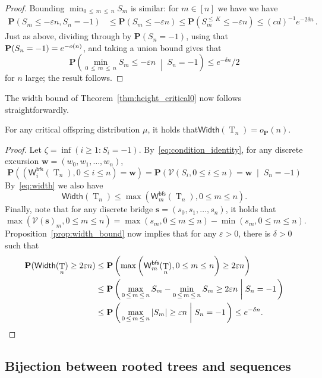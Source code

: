\documentclass[AHL,Unicode,longabstracts,published]{cedram}
\newcommand*\W{\mathsf{W}}
\newcommand{\bfs}{\mathsf{bfs}}
\newcommand{\p}{\mathbf{P}}
\newcommand{\bfw}{\mathbf{w}}
\newcommand{\bffs}{\mathbf{s}}
\newcommand{\Width}{\mathsf{Width}}
\DeclareMathOperator{\rtree}{T}
\newcommand{\cV}{\mathcal{V}}
\newcommand{\set}[1]{\left(#1 \right)}
\newcommand{\Cprob}[2]{\mathbf{P}\set{\left. #1 \; \middle| \; #2\right.}}
\newcommand{\probC}[2]{\mathbf{P}\set{\left. #1 \; \middle| \; #2 \right. }}
\providecommand{\eps}{}
\renewcommand{\eps}{\varepsilon}
\begin{document}
\begin{proof}
Bounding $\min_{0\, \le\,m\,\le\,n} S_m$ is similar: for $m \in [n]$ we have we have
\begin{align*}
\p(S_m \le -\eps n,S_n=-1) & \le \p(S_m \le -\eps n) \le
\p\left(S_m^{\le\,K} \le -\eps n\right)
\le (cd)^{-1} e^{-2\delta n}\,.
\end{align*}
Just as above, dividing through by $\p(S_n=-1)$, using that $\p(S_n = -1)\linebreak = e^{-o(n)}$, and taking a union bound gives that
\[
\probC{\min_{0\,\le\,m\,\le\,n} S_m \le -\eps n}{S_n=-1}
\le e^{-\delta n}/2
\]
for $n$ large; the result follows.
\end{proof}

The width bound of Theorem~\ref{thm:height_critical0} now follows straightforwardly.
\begin{coro}\label{cor:width_bound}
For any critical offspring distribution $\mu$, it holds that\linebreak $\Width(\rtree_n)=o_{\p}(n)$.
\end{coro}
\begin{proof}
Let $\zeta=\inf(i \ge 1: S_i=-1)$. By~\eqref{eq:condition_identity}, for any discrete excursion $\bfw=(w_0,w_1,\ldots,w_n)$,
\[
\p\left(\left(\W^{\bfs}_{i}(\rtree_n),0 \le i \le n\right)=\bfw\right) =
\Cprob{\cV(S_i,0 \le i \le n)=\bfw}{S_n=-1}
\]
By~\eqref{eq:width} we also have
\[
\Width(\rtree_n) \leq \max \left(\W^{\bfs}_m(\rtree_n),0 \le m \le n\right).
\]
Finally, note that for any discrete bridge $\bffs=(s_0,s_1,\ldots,s_n)$, it holds that
\[
\max(\cV(\bffs)_m,0 \le m \le n) = \max(s_m,0 \le m \le n)-\min(s_m,0 \le m \le n).
\]
Proposition~\ref{prop:width_bound} now implies that for any $\eps > 0$, there is $\delta > 0$ such that
\begin{align*}
\p(\Width(\rtree_n) \ge 2\eps n) & \le \p\left(\max \left(\W^{\bfs}_m(\rtree_n),0 \le m \le n\right) \ge 2\eps n\right) \\
& \le \Cprob{\max_{0\, \le\,m \,\le\,n} S_m-\min_{0\,\le\,m\,\le\,n} S_m\ge 2\eps n}{S_n=-1} \\
& \le \Cprob{\max_{0\,\le\,m\,\le\,n} |S_m| \ge\eps n}{S_n=-1} \le e^{-\delta n}. \qedhere
\end{align*}
\end{proof}


\subsection{Bijection between rooted trees and sequences}
\end{document}
